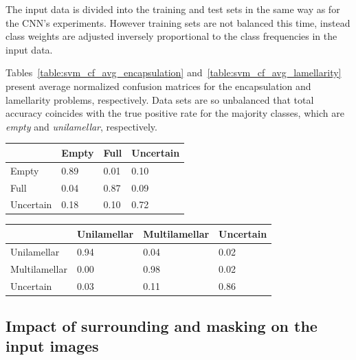 \documentclass[a4paper, 11pt, table]{article}
\begin{document}
The input data is divided into the training and test sets in the same way as for the CNN's experiments. However training sets are not balanced this time, instead class weights are adjusted inversely proportional to the class frequencies in the input data.

Tables~\ref{table:svm_cf_avg_encapsulation} and~\ref{table:svm_cf_avg_lamellarity} present average normalized confusion matrices for the encapsulation and lamellarity problems, respectively. Data sets are so unbalanced that total accuracy coincides with the true positive rate for the majority classes, which are \textit{empty} and \textit{unilamellar}, respectively. 

\begin{center}
\label{table:svm_cf_avg_encapsulation}
\begin{tabular}{|L{2.5cm} |C{2.5cm} |C{2.5cm} |C{2.5cm}|}
\toprule
 & Empty & Full & Uncertain \\
\midrule
Empty & 0.89 & 0.01 & 0.10 \\
Full & 0.04 & 0.87 & 0.09 \\
Uncertain & 0.18 & 0.10 & 0.72 \\
\bottomrule
\end{tabular}
\end{center}

\begin{center}
\label{table:svm_cf_avg_lamellarity}
\begin{tabular}{|L{2.5cm} |C{2.5cm} |C{2.5cm} |C{2.5cm}|}
\toprule
 & Unilamellar & Multilamellar & Uncertain \\
\midrule
Unilamellar & 0.94 & 0.04 & 0.02 \\
Multilamellar & 0.00 & 0.98 & 0.02 \\
Uncertain & 0.03 & 0.11 & 0.86 \\
\bottomrule
\end{tabular}
\end{center}

\subsection{Impact of surrounding and masking on the input images}
\end{document}
